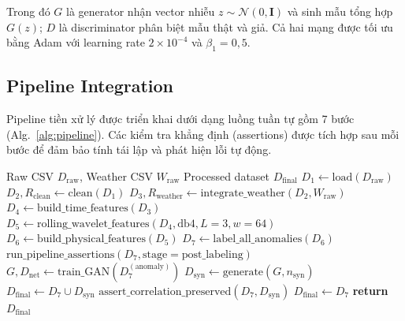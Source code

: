 \documentclass[conference]{IEEEtran}
\begin{document}
Trong đó $G$ là generator nhận vector nhiễu $z \sim \mathcal{N}(0,\mathbf{I})$
và sinh mẫu tổng hợp $G(z)$; $D$ là discriminator phân biệt mẫu thật và giả.
Cả hai mạng được tối ưu bằng Adam với learning rate $2\times 10^{-4}$ và $\beta_1 = 0{,}5$.

\subsection{Pipeline Integration}

Pipeline tiền xử lý được triển khai dưới dạng luồng tuần tự gồm 7 bước (Alg.~\ref{alg:pipeline}).
Các kiểm tra khẳng định (assertions) được tích hợp sau mỗi bước
để đảm bảo tính tái lập và phát hiện lỗi tự động.

\begin{algorithm}[htbp]
\caption{DS108-ELECTRIMIGHT PIPELINE}
\label{alg:pipeline}
\begin{algorithmic}[1]
\REQUIRE Raw CSV $D_{\text{raw}}$, Weather CSV $W_{\text{raw}}$
\ENSURE Processed dataset $D_{\text{final}}$
\STATE $D_1 \leftarrow \text{load}(D_{\text{raw}})$ 
\STATE $D_2, R_{\text{clean}} \leftarrow \text{clean}(D_1)$
\STATE {}
\STATE $D_3, R_{\text{weather}} \leftarrow \text{integrate\_weather}(D_2, W_{\text{raw}})$
\STATE {}
\STATE $D_4 \leftarrow \text{build\_time\_features}(D_3)$
\STATE {}
\STATE $D_5 \leftarrow \text{rolling\_wavelet\_features}(D_4, \text{db4}, L=3, w=64)$
\STATE $D_6 \leftarrow \text{build\_physical\_features}(D_5)$
\STATE {}
\STATE $D_7 \leftarrow \text{label\_all\_anomalies}(D_6)$
\STATE {}
\STATE $\text{run\_pipeline\_assertions}(D_7, \text{stage}=\text{post\_labeling})$
    \STATE $G, D_{\text{net}} \leftarrow \text{train\_GAN}(D_7^{(\text{anomaly})})$
    \STATE $D_{\text{syn}} \leftarrow \text{generate}(G, n_{\text{syn}})$
    \STATE $D_{\text{final}} \leftarrow D_7 \cup D_{\text{syn}}$
    \STATE $\text{assert\_correlation\_preserved}(D_7, D_{\text{syn}})$
\ELSE
    \STATE $D_{\text{final}} \leftarrow D_7$
\ENDIF
\STATE \textbf{return} $D_{\text{final}}$
\end{algorithmic}
\end{algorithm}
\end{document}
